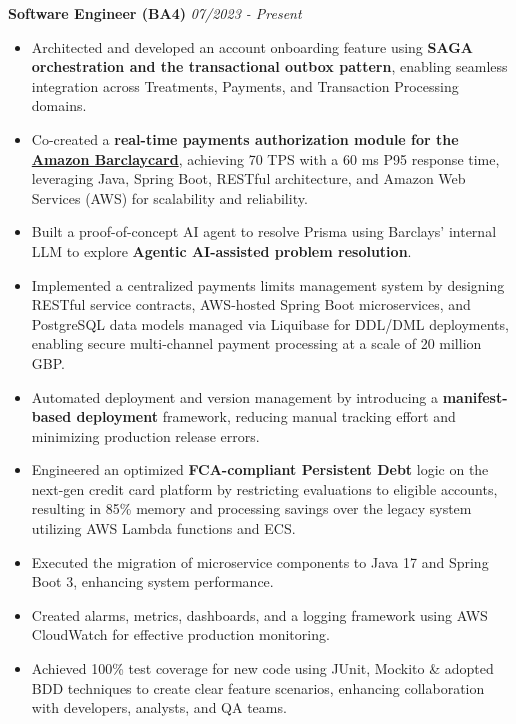 \documentclass[a4,10pt]{article}
\newenvironment{zitemize}{
\begin{itemize}\itemsep0pt \parskip0pt \parsep1pt}
{\end{itemize}\vspace{-0.5cm}}
\begin{document}
\textbf{Software Engineer (BA4)} \hfill \textit{07/2023 - Present} \\
\vspace{-5pt}
\begin{zitemize}
    \item Architected and developed an account onboarding feature using \textbf{SAGA orchestration and the transactional outbox pattern}, enabling seamless integration across Treatments, Payments, and Transaction Processing domains.
    \item Co-created a \textbf{real-time payments authorization module for the \href{https://www.amazon.co.uk/dp/B0BH98211K}{Amazon Barclaycard}}, achieving 70 TPS with a 60 ms P95 response time, leveraging Java, Spring Boot, RESTful architecture, and Amazon Web Services (AWS) for scalability and reliability.
    \item Built a proof-of-concept AI agent to resolve Prisma using Barclays’ internal LLM to explore \textbf{Agentic AI-assisted problem resolution}.
    \item Implemented a centralized payments limits management system by designing RESTful service contracts, AWS-hosted Spring Boot microservices, and PostgreSQL data models managed via Liquibase for DDL/DML deployments, enabling secure multi-channel payment processing at a scale of 20 million GBP.
    \item Automated deployment and version management by introducing a \textbf{manifest-based deployment} framework, reducing manual tracking effort and minimizing production release errors.
    \item Engineered an optimized \textbf{FCA-compliant Persistent Debt} logic on the next-gen credit card platform by restricting evaluations to eligible accounts, resulting in 85\% memory and processing savings over the legacy system utilizing AWS Lambda functions and ECS.
    \item Executed the migration of microservice components to Java 17 and Spring Boot 3, enhancing system performance.
    \item Created alarms, metrics, dashboards, and a logging framework using AWS CloudWatch for effective production monitoring.
    \item Achieved 100\% test coverage for new code using JUnit, Mockito \& adopted BDD techniques to create clear feature scenarios, enhancing collaboration with developers, analysts, and QA teams.
\end{zitemize}


\end{document}
